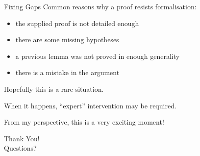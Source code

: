 \documentclass{beamer}
\begin{document}
\begin{frame}{Fixing Gaps}
Common reasons why a proof resists formalisation:

\medskip

\begin{itemize}
  \item the supplied proof is not detailed enough
  \smallskip
  \item there are some missing hypotheses
  \smallskip
  \item a previous lemma was not proved in enough generality
  \smallskip
  \item there is a mistake in the argument
\end{itemize}

\bigskip

Hopefully this is a rare situation.

\bigskip

When it happens, ``expert'' intervention may be required.

\bigskip

From my perspective, this is a very exciting moment!
\end{frame}

\begin{frame}
\begin{center}
  {\huge Thank You!}\\[30pt]
  {\huge Questions?}
\end{center}
\end{frame}
\end{document}
